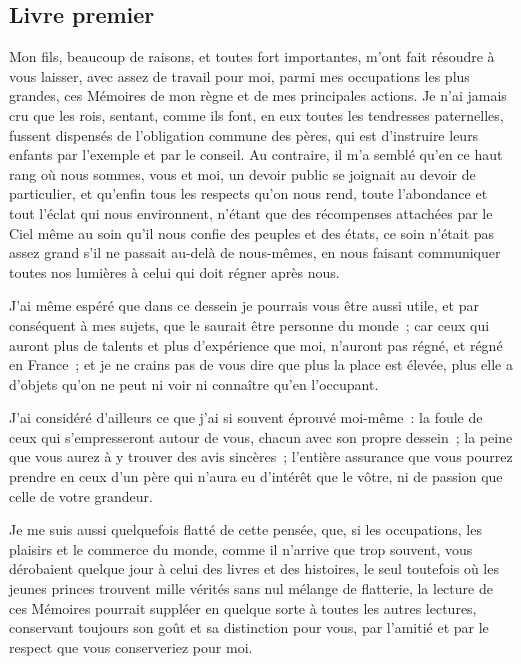 \documentclass[french,twoside]{book} %
\begin{document}
\subsection[{Livre premier}]{Livre premier}
\noindent Mon fils, beaucoup de raisons, et toutes fort importantes, m’ont fait résoudre à vous laisser, avec assez de travail pour moi, parmi mes occupations les plus grandes, ces Mémoires de mon règne et de mes principales actions. Je n’ai jamais cru que les rois, sentant, comme ils font, en eux toutes les tendresses paternelles, fussent dispensés de l’obligation commune des pères, qui est d’instruire leurs enfants par l’exemple et par le conseil. Au contraire, il m’a semblé qu’en ce haut rang où nous sommes, vous et moi, un devoir public se joignait au devoir de particulier, et qu’enfin tous les respects qu’on nous rend, toute l’abondance et tout l’éclat qui nous environnent, n’étant que des récompenses attachées par le Ciel même au soin qu’il nous confie des peuples et des états, ce soin n’était pas assez grand s’il ne passait au-delà de nous-mêmes, en nous faisant communiquer toutes nos lumières à celui qui doit régner après nous.\par
J’ai même espéré que dans ce dessein je pourrais vous être aussi utile, et par conséquent à mes sujets, que le saurait être personne du monde ; car ceux qui auront plus de talents et plus d’expérience que moi, n’auront pas régné, et régné en France ; et je ne crains pas de vous dire que plus la place est élevée, plus elle a d’objets qu’on ne peut ni voir ni connaître qu’en l’occupant.\par
J’ai considéré d’ailleurs ce que j’ai si souvent éprouvé moi-même : la foule de ceux qui s’empresseront autour de vous, chacun avec son propre dessein ; la peine que vous aurez à y trouver des avis sincères ; l’entière assurance que vous pourrez prendre en ceux d’un père qui n’aura eu d’intérêt que le vôtre, ni de passion que celle de votre grandeur.\par
Je me suis aussi quelquefois flatté de cette pensée, que, si les occupations, les plaisirs et le commerce du monde, comme il n’arrive que trop souvent, vous dérobaient quelque jour à celui des livres et des histoires, le seul toutefois où les jeunes princes trouvent mille vérités sans nul mélange de flatterie, la lecture de ces Mémoires pourrait suppléer en quelque sorte à toutes les autres lectures, conservant toujours son goût et sa distinction pour vous, par l’amitié et par le respect que vous conserveriez pour moi.\par
\end{document}
